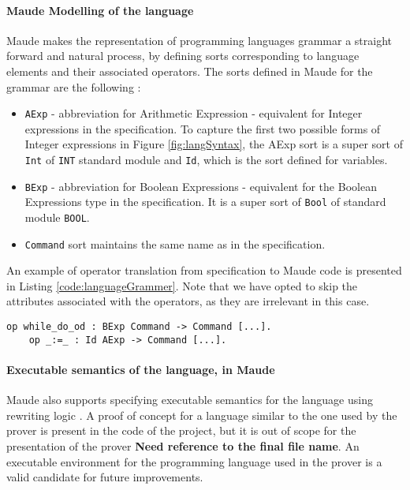 \documentclass[12pt,a4paper]{article}
\begin{document}
{\paragraph{Maude Modelling of the language}
Maude makes the representation of programming languages grammar a straight forward and natural process, by defining sorts corresponding to language elements and their associated operators. The sorts defined in Maude for the grammar are the following : 
\begin{itemize}
	\item \texttt{AExp} - abbreviation for Arithmetic Expression - equivalent for Integer expressions in the specification. To capture the first two possible forms of Integer expressions in Figure \ref{fig:langSyntax}, the AExp sort is a super sort of \texttt{Int} of \texttt{INT} standard module and \texttt{Id}, which is the sort defined for variables.
	\item \texttt{BExp} - abbreviation for Boolean Expressions - equivalent for the Boolean Expressions type in the specification. It is a super sort of \texttt{Bool} of standard module \texttt{BOOL}. 
	\item \texttt{Command} sort maintains the same name as in the specification.
\end{itemize}
An example of operator translation from specification to Maude code is presented in Listing \ref{code:languageGrammer}. Note that we have opted to skip the attributes associated with the operators, as they are irrelevant in this case.
\\

\begin{lstlisting}[label=code:languageGrammer,caption=Example of operator translation to Maude code]
	op while_do_od : BExp Command -> Command [...].
	op _:=_ : Id AExp -> Command [...]. 
\end{lstlisting}

\paragraph{Executable semantics of the language, in Maude}
Maude also supports specifying executable semantics for the language using rewriting logic \cite{rewrConcurrency}. A proof of concept for a language similar to the one used by the prover is present in the code of the project, but it is out of scope for the presentation of the prover \textbf{Need reference to the final file name}. An executable environment for the programming language used in the prover is a valid candidate for future improvements.
}
\end{document}
